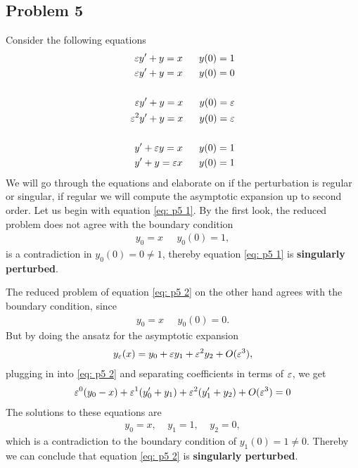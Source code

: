 \subsection{Problem 5}
Consider the following equations
\begin{align}
    \label{eq: p5 1}\varepsilon y' + y = x \;\;\;\;\;\; y(0) = 1\\
    \label{eq: p5 2}\varepsilon y' + y = x \;\;\;\;\;\; y(0) = 0\\
    \nonumber\\
    \label{eq: p5 3}\varepsilon y' + y = x \;\;\;\;\;\; y(0) = \varepsilon\\
    \label{eq: p5 4}\varepsilon^2 y' + y = x \;\;\;\;\;\; y(0) = \varepsilon\\
    \nonumber\\
    \label{eq: p5 5}y' + \varepsilon y = x \;\;\;\;\;\; y(0) = 1\\
    \label{eq: p5 6}y' + y = \varepsilon x \;\;\;\;\;\; y(0) = 1
\end{align}
We will go through the equations and elaborate on if the perturbation is
regular or singular, if regular we will compute the asymptotic expansion up
to second order.
Let us begin with equation \ref{eq: p5 1}. By the first look, the reduced
problem does not agree with the boundary condition
\begin{align}
    y_0 = x \;\;\;\;\; y_0(0) = 1,
\end{align}
is a contradiction in $y_0(0) = 0 \neq 1$, thereby equation \ref{eq: p5 1} is
\textbf{singularly perturbed}.

The reduced problem of equation \ref{eq: p5 2} on the other hand agrees with
the boundary condition, since
\begin{align}
    y_0 = x \;\;\;\;\; y_0(0) = 0.
\end{align}
But by doing the ansatz for the asymptotic expansion
\begin{align}
    y_\varepsilon(x) = y_0 + \varepsilon y_1 + \varepsilon^2 y_2 + O(\varepsilon^3),
\end{align}
plugging in into \ref{eq: p5 2} and separating coefficients in terms of
$\varepsilon$, we get
\begin{align}
    \varepsilon^0 (y_0 -x) + \varepsilon^1(y_0' + y_1) + \varepsilon^2(y_1' + y_2) + O(\varepsilon^3) = 0
\end{align}
The solutions to these equations are
\begin{align}
    y_0 = x, \;\;\;\; y_1 = 1, \;\;\;\; y_2 = 0,
\end{align}
which is a contradiction to the boundary condition of $y_1(0) = 1 \neq 0$.
Thereby we can conclude that equation \ref{eq: p5 2} is \textbf{singularly
perturbed}.

